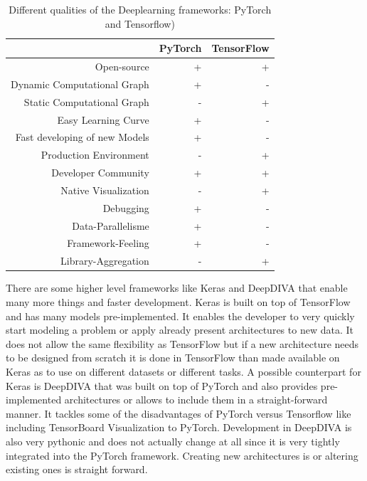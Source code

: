 \begin{table}[t] \centering
{}
\caption{Different qualities of the Deeplearning frameworks: PyTorch and Tensorflow)}
\begin{tabular}{@{}rrr@{}}
\toprule & PyTorch & TensorFlow \\
\midrule
Open-source									& + & + \\
Dynamic Computational Graph			& + & -  \\
Static Computational Graph				& - & +  \\
Easy Learning Curve							& + & -  \\
Fast developing of new Models			& + & -  \\
Production Environment					& - & + \\
Developer Community						& + & + \\
Native Visualization							& - & +  \\
Debugging										& + & -  \\
Data-Parallelisme								& + & -  \\
Framework-Feeling							& + & -  \\
Library-Aggregation							& - & +  \\

\bottomrule
\end{tabular}
\label{tbl:DeepLearningFrameworks}
\end{table}

There are some higher level frameworks like Keras \cite{keras} and DeepDIVA \cite{deepdiva} that enable many more things and faster development. Keras is built on top of TensorFlow and has many models pre-implemented. It enables the developer to very quickly start modeling a problem or apply already present architectures to new data. It does not allow the same flexibility as TensorFlow but if a new architecture needs to be designed from scratch it is done in TensorFlow than made available on Keras as to use on different datasets or different tasks. A possible counterpart for Keras is DeepDIVA that was built on top of PyTorch and also provides pre-implemented architectures or allows to include them in a straight-forward manner. It tackles some of the disadvantages of PyTorch versus Tensorflow like including TensorBoard Visualization to PyTorch. Development in DeepDIVA is also very pythonic and does not actually change at all since it is very tightly integrated into the PyTorch framework. Creating new architectures is or altering existing ones is straight forward.

